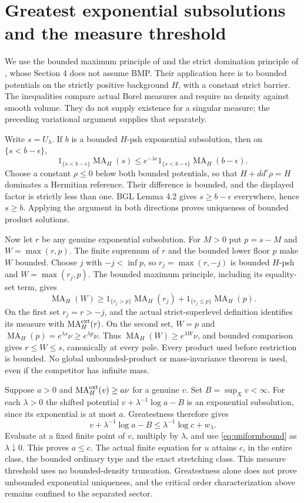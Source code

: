 \documentclass[11pt]{article}
\newcommand{\ddc}{dd^c}
\newcommand{\MA}{\operatorname{MA}}
\theoremstyle{remark}\newtheorem{remark}[theorem]{Remark}
\begin{document}
\section{Greatest exponential subsolutions and the measure threshold}
We use the bounded maximum principle of \cite[Lemma 1.2]{GL2} and
the strict domination principle of \cite[Lemma 4.2]{BGL}, whose Section 4
does not assume BMP. Their application here is to bounded potentials
on the strictly positive background $H$, with a constant strict barrier.
The inequalities compare actual Borel measures and require no density
against smooth volume. They do not supply existence for a singular measure;
the preceding variational argument supplies that separately.

Write $s=U_\lambda$. If $b$ is a bounded $H$-psh exponential subsolution,
then on $\{s<b-\epsilon\}$,
\[
 1_{\{s<b-\epsilon\}}\MA_H(s)
 \leq e^{-\lambda\epsilon}
       1_{\{s<b-\epsilon\}}\MA_H(b-\epsilon).
\]
Choose a constant $\rho\leq0$ below both bounded potentials, so that
$H+\ddc\rho=H$ dominates a Hermitian reference. Their difference is bounded,
and the displayed factor is strictly less than one. BGL Lemma 4.2 gives
$s\geq b-\epsilon$ everywhere, hence $s\geq b$. Applying the argument in
both directions proves uniqueness of bounded product solutions.

Now let $r$ be any genuine exponential subsolution. For $M>0$ put
$p=s-M$ and $W=\max(r,p)$. The finite supremum of $r$ and the bounded
lower floor $p$ make $W$ bounded. Choose $j$ with $-j<\inf p$, so
$r_j=\max(r,-j)$ is bounded $H$-psh and $W=\max(r_j,p)$. The bounded
maximum principle, including its equality-set term, gives
\[
 \MA_H(W)\geq
 1_{\{r_j>p\}}\MA_H(r_j)+1_{\{r_j\leq p\}}\MA_H(p).
\]
On the first set $r_j=r>-j$, and the actual strict-superlevel definition
identifies its measure with $\MA_H^{\rm ext}(r)$. On the second set,
$W=p$ and $\MA_H(p)=e^{\lambda s}\nu\geq e^{\lambda p}\nu$.
Thus $\MA_H(W)\geq e^{\lambda W}\nu$, and bounded comparison gives
$r\leq W\leq s$, canonically at every pole. Every product used before
restriction is bounded. No global unbounded-product or mass-invariance
theorem is used, even if the competitor has infinite mass.

Suppose $a>0$ and $\MA_H^{\rm ext}(v)\geq a\nu$ for a genuine $v$.
Set $B=\sup_Xv<\infty$. For each $\lambda>0$ the shifted potential
$v+\lambda^{-1}\log a-B$ is an exponential subsolution, since its
exponential is at most $a$. Greatestness therefore gives
\[
 v+\lambda^{-1}\log a-B
 \leq\lambda^{-1}\log c+w_\lambda.
\]
Evaluate at a fixed finite point of $v$, multiply by $\lambda$, and
use \eqref{eq:uniformbound} as $\lambda\downarrow0$. This proves $a\leq c$.
The actual finite equation for $u$ attains $c$, in the entire class, the
bounded ordinary type and the exact stretching class. This measure threshold
uses no bounded-density truncation. Greatestness alone does not prove
unbounded exponential uniqueness, and the critical order characterization
above remains confined to the separated sector.
\end{document}
